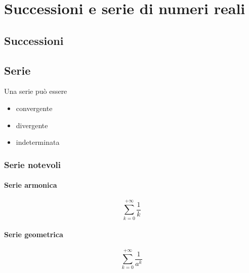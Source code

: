 

\chapter{Successioni e serie di numeri reali}\label{ch:series}
\section{Successioni}
\begin{definition}
\end{definition}

\section{Serie}
\begin{definition}
\end{definition}
\begin{definition}
\end{definition}
\begin{definition} Una serie può essere
\begin{itemize}
    \item convergente
    \item divergente
    \item indeterminata
\end{itemize}
\end{definition}

\subsection{Serie notevoli}
\subsubsection{Serie armonica}
\begin{definition}
\begin{equation}
    \sum_{k=0}^{+\infty} \dfrac{1}{k}
\end{equation}
\end{definition}
\subsubsection{Serie geometrica}
\begin{definition}
\begin{equation}
    \sum_{k=0}^{+\infty} \dfrac{1}{a^k}
\end{equation}
\end{definition}
